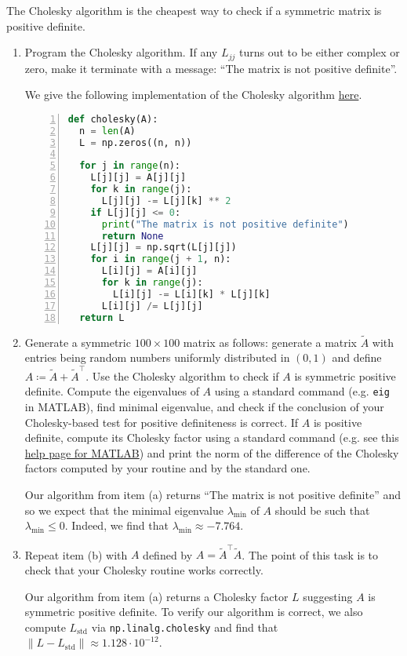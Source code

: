 \documentclass{../../../kin_math}
\begin{document}
\begin{questions}
  \question The Cholesky algorithm is the cheapest way to check if a symmetric matrix is positive definite.
  \begin{enumerate}
    \item Program the Cholesky algorithm. If any $L_{jj}$ turns out to be either complex or zero, make it terminate with a message: ``The matrix is not positive definite''.
    \begin{solution}
      We give the following implementation of the Cholesky algorithm \href{https://github.com/elijahkin/school/blob/main/umd/amsc660/hw5/hw5.ipynb}{here}.
      \begin{lstlisting}[language=python, numbers=left, xleftmargin=5em]
def cholesky(A):
  n = len(A)
  L = np.zeros((n, n))

  for j in range(n):
    L[j][j] = A[j][j]
    for k in range(j):
      L[j][j] -= L[j][k] ** 2
    if L[j][j] <= 0:
      print("The matrix is not positive definite")
      return None
    L[j][j] = np.sqrt(L[j][j])
    for i in range(j + 1, n):
      L[i][j] = A[i][j]
      for k in range(j):
        L[i][j] -= L[i][k] * L[j][k]
      L[i][j] /= L[j][j]
  return L
      \end{lstlisting}
    \end{solution}
    \item Generate a symmetric $100 \times 100$ matrix as follows: generate a matrix $\tilde{A}$ with entries being random numbers uniformly distributed in $(0, 1)$ and define $A \coloneqq \tilde{A} + \tilde{A}^\top$. Use the Cholesky algorithm to check if $A$ is symmetric positive definite. Compute the eigenvalues of $A$ using a standard command (e.g. \texttt{eig} in MATLAB), find minimal eigenvalue, and check if the conclusion of your Cholesky-based test for positive definiteness is correct. If $A$ is positive definite, compute its Cholesky factor using a standard command (e.g. see this \href{https://www.mathworks.com/help/matlab/ref/chol.html}{help page for MATLAB}) and print the norm of the difference of the Cholesky factors computed by your routine and by the standard one.
    \begin{solution}
      Our algorithm from item (a) returns ``The matrix is not positive definite'' and so we expect that the minimal eigenvalue $\lambda_\text{min}$ of $A$ should be such that $\lambda_\text{min} \leq 0$. Indeed, we find that $\lambda_\text{min} \approx -7.764$.
    \end{solution}
    \item Repeat item (b) with $A$ defined by $A = \tilde{A}^\top \tilde{A}$. The point of this task is to check that your Cholesky routine works correctly.
    \begin{solution}
      Our algorithm from item (a) returns a Cholesky factor $L$ suggesting $A$ is symmetric positive definite. To verify our algorithm is correct, we also compute $L_\text{std}$ via \texttt{np.linalg.cholesky} and find that $\lVert L - L_\text{std} \rVert \approx 1.128 \cdot 10^{-12}$.
    \end{solution}
  \end{enumerate}
\end{questions}
\end{document}
